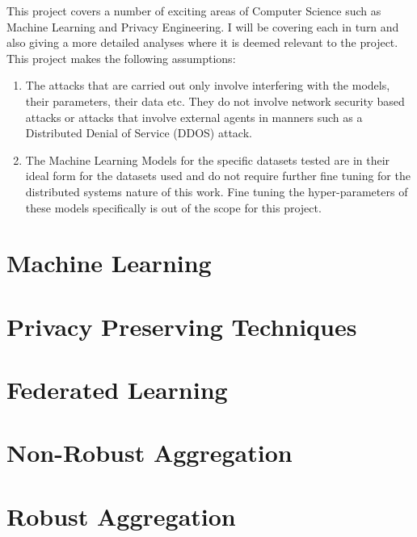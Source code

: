 This project covers a number of exciting areas of Computer Science such as Machine Learning and Privacy Engineering. 
I will be covering each in turn and also giving a more detailed analyses where it is deemed relevant to the project.
This project makes the following assumptions:

\begin{enumerate}
    \item The attacks that are carried out only involve interfering with the models, their parameters, their data etc. They do not involve network security based attacks or attacks that involve external agents in manners such as a Distributed Denial of Service (DDOS) attack.
    
    \item The Machine Learning Models for the specific datasets tested are in their ideal form for the datasets used and do not require further fine tuning for the distributed systems nature of this work. Fine tuning the hyper-parameters of these models specifically is out of the scope for this project.
\end{enumerate}


\section{Machine Learning}




\section{Privacy Preserving Techniques}




\section{Federated Learning}




\section{Non-Robust Aggregation}




\section{Robust Aggregation}



